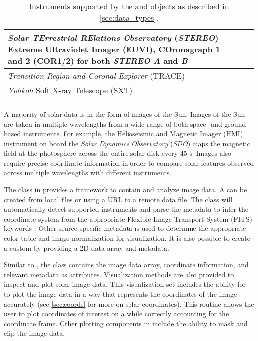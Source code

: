 \begin{table}
\begin{center}
\begin{tabular}{p{12cm}cc}
\hline
\textit{Solar TErrestrial RElations Observatory} (\textit{STEREO}) Extreme Ultraviolet Imager (EUVI), COronagraph 1 and 2 (COR1/2) for both \textit{STEREO A} and \textit{B} & \citet{howard2008sun} \\
\hline
\textit{Transition Region and Coronal Explorer} (TRACE)  & \citet{handy99}  \\
\hline
\textit{Yohkoh} Soft X-ray Telescope (SXT) & \citet{tsuneta1991soft}  \\
\hline
\end{tabular}
\end{center}
\caption{Instruments supported by the \Timeseries and \Map objects as described in \autoref{sec:data_types}.}
\label{tab:instruments}
\end{table}

\subsubsection{\Map}
\label{sec:map}
A majority of solar data is in the form of images of the Sun.
Images of the Sun are taken in multiple wavelengths from a wide range of both space- and ground-based instruments.
For example, the Helioseismic and Magnetic Imager (HMI) instrument on board the \textit{Solar Dynamics Observatory} (\textit{SDO}) maps the magnetic field at the photosphere across the entire solar disk every 45 s.
Images also require precise coordinate information in order to compare solar features observed across multiple wavelengths with different instruments.

The \Map class in \sunpypkg provides a framework to contain and analyze image data.
A \Map can be created from local files or using a URL to a remote data file.
The \Map class will automatically detect supported instruments and parse the metadata to infer the coordinate system from the appropriate Flexible Image Transport System (FITS) keywords \citep{2006A&A...449..791T, refId0}.
Other source-specific metadata is used to determine the appropriate color table and image normalization for visualization.
It is also possible to create a custom \Map by providing a 2D data array and metadata.

Similar to \Timeseries, the \Map class contains the image data array, coordinate information, and relevant metadata as attributes.
Visualization methods are also provided to inspect and plot solar image data.
This visualization set includes the ability for \Map to plot the image data in a way that represents the coordinates of the image accurately (see \autoref{sec:coords} for more on solar coordinates).
This routine allows the user to plot coordinates of interest on a \Map while correctly accounting for the coordinate frame.
Other plotting components in \Map include the ability to mask and clip the image data.


